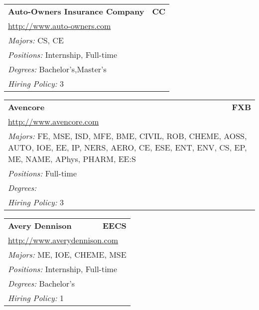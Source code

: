 \documentclass[twoside]{article}
\begin{document}
\begin{center}
\begin{multicols}{3}
\begin{FlushLeft}
\begin{minipage}{\columnwidth}
\end{minipage}
 
\begin{minipage}{\columnwidth}\begin{tabularx}{.95\columnwidth}{Xr}
                 {\Large\bf Auto-Owners Insurance Company} & {\Large\bf CC}\\
    \multicolumn{2}{p{.95\columnwidth}}{\url{http://www.auto-owners.com}}\\
    \multicolumn{2}{p{.95\columnwidth}}{\emph{Majors:} CS, CE}\\
    \multicolumn{2}{p{.95\columnwidth}}{\emph{Positions:} Internship, Full-time}\\
    \multicolumn{2}{p{.95\columnwidth}}{\emph{Degrees:} Bachelor's,Master's}\\
    \multicolumn{2}{p{.95\columnwidth}}{\emph{Hiring Policy:} 3}\\
    \end{tabularx}
    
\end{minipage}
 
\begin{minipage}{\columnwidth}\begin{tabularx}{.95\columnwidth}{Xr}
                 {\Large\bf Avencore} & {\Large\bf FXB}\\
    \multicolumn{2}{p{.95\columnwidth}}{\url{http://www.avencore.com}}\\
    \multicolumn{2}{p{.95\columnwidth}}{\emph{Majors:} FE, MSE, ISD, MFE, BME, CIVIL, ROB, CHEME, AOSS, AUTO, IOE, EE, IP, NERS, AERO, CE, ESE, ENT, ENV, CS, EP, ME, NAME, APhys, PHARM, EE:S}\\
    \multicolumn{2}{p{.95\columnwidth}}{\emph{Positions:} Full-time}\\
    \multicolumn{2}{p{.95\columnwidth}}{\emph{Degrees:} }\\
    \multicolumn{2}{p{.95\columnwidth}}{\emph{Hiring Policy:} 3}\\
    \end{tabularx}
    
\end{minipage}
 
\begin{minipage}{\columnwidth}\begin{tabularx}{.95\columnwidth}{Xr}
                 {\Large\bf Avery Dennison} & {\Large\bf EECS}\\
    \multicolumn{2}{p{.95\columnwidth}}{\url{http://www.averydennison.com}}\\
    \multicolumn{2}{p{.95\columnwidth}}{\emph{Majors:} ME, IOE, CHEME, MSE}\\
    \multicolumn{2}{p{.95\columnwidth}}{\emph{Positions:} Internship, Full-time}\\
    \multicolumn{2}{p{.95\columnwidth}}{\emph{Degrees:} Bachelor's}\\
    \multicolumn{2}{p{.95\columnwidth}}{\emph{Hiring Policy:} 1}\\
    \end{tabularx}
    

\end{minipage}
\end{FlushLeft}
\end{multicols}
\end{center}
\end{document}
